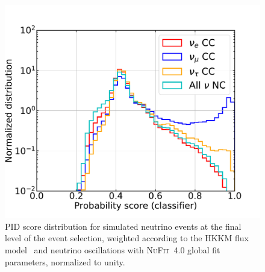 \begin{figure}
    \centering
    \includegraphics[width=0.8\linewidth]{figures/icecube/classification/bdt_score_normalized.pdf}
    \caption{PID score distribution for simulated neutrino events at the final level of the event selection, weighted according to the HKKM flux model~\cite{Honda:2015fha} and neutrino oscillations with \textsc{NuFit}~4.0\cite{nufit40} global fit parameters, normalized to unity.}
    \label{fig:pid-score}
\end{figure}